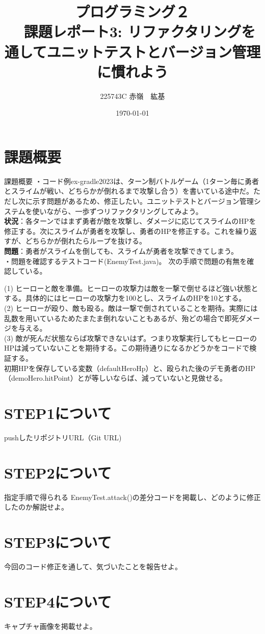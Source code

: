 \documentclass[a4paper, 11pt, titlepage]{jsarticle}
\title{プログラミング２\\　課題レポート3: リファクタリングを通してユニットテストとバージョン管理に慣れよう}
\author{225743C 赤嶺　紘基}
\date{\today}
\begin{document}
\maketitle

\section{課題概要}
\begin{itembox}[l]{課題概要}
・コード例ex-gradle2023は、ターン制バトルゲーム（1ターン毎に勇者とスライムが戦い、どちらかが倒れるまで攻撃し合う）を書いている途中だ。ただし次に示す問題があるため、修正したい。ユニットテストとバージョン管理システムを使いながら、一歩ずつリファクタリングしてみよう。\\

\textbf{状況}：各ターンではまず勇者が敵を攻撃し、ダメージに応じてスライムのHPを修正する。次にスライムが勇者を攻撃し、勇者のHPを修正する。これを繰り返すが、どちらかが倒れたらループを抜ける。\\
\textbf{問題}：勇者がスライムを倒しても、スライムが勇者を攻撃できてしまう。\\

・問題を確認するテストコード(EnemyTest.java)。
次の手順で問題の有無を確認している。

(1) ヒーローと敵を準備。ヒーローの攻撃力は敵を一撃で倒せるほど強い状態とする。具体的にはヒーローの攻撃力を100とし、スライムのHPを10とする。\\

(2) ヒーローが殴り、敵も殴る。敵は一撃で倒されていることを期待。実際には乱数を用いているためたまたま倒れないこともあるが、殆どの場合で即死ダメージを与える。\\

(3) 敵が死んだ状態ならば攻撃できないはず。つまり攻撃実行してもヒーローのHPは減っていないことを期待する。この期待通りになるかどうかをコードで検証する。\\

初期HPを保存している変数（defaultHeroHp）と、殴られた後のデモ勇者のHP（demoHero.hitPoint）とが等しいならば、減っていないと見做せる。\\
\end{itembox}

\section{STEP1について}
pushしたリポジトリURL（Git URL)\\


\section{STEP2について}
指定手順で得られる EnemyTest.attack()の差分コードを掲載し、どのように修正したのか解説せよ。\\


\section{STEP3について}
今回のコード修正を通して、気づいたことを報告せよ。\\


\section{STEP4について}
キャプチャ画像を掲載せよ。\\
\end{document}
